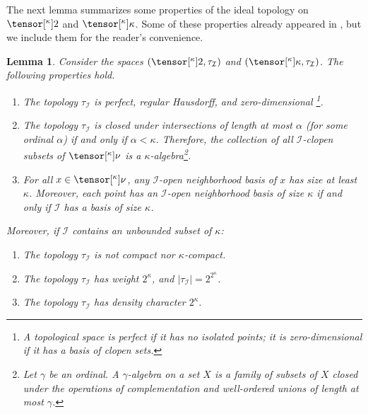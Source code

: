 \documentclass{amsart}
\numberwithin{equation}{section}
\newcommand{\I}{\mathcal{I}}
\newcommand{\pre}[2]{\tensor[^{#1}]{#2}{}}
\newcommand{\1}{\mathbf{I}}
\newcommand{\2}{\mathbf{II}}
\renewcommand{\a}{\alpha}
\newcommand{\g}{\gamma}
\renewcommand{\k}{\kappa}
\newtheorem{lemma}[theorem]{Lemma}
\theoremstyle{definition}
\theoremstyle{remark}
\begin{document}
The next lemma summarizes some properties of the ideal topology on \(\pre{\k}{2}\) and \(\pre{\k}{\k}\). Some of these properties already appeared in \cite{HKSW22}, but we include them for the reader's convenience. 
\begin{lemma}\label{lem:basics}
Consider the spaces \((\pre{\k}{2}, \tau_\I)\) and \((\pre{\k}{\k}, \tau_\I)\). The following properties hold.
\begin{enumerate}[label={\upshape (\arabic*)}, leftmargin=2pc]
    \item\label{T2} The topology \(\tau_\I\) is perfect, regular Hausdorff, and zero-dimensional {}\footnote{A topological space is perfect if it has no isolated points; it is zero-dimensional if it has a basis of clopen sets.}.
    \item\label{add}  The topology \(\tau_\I\) is closed under intersections of length at most \(\a \) (for some ordinal $\a$) if and only if \(\a < \kappa\). Therefore, the collection of all \(\I\)-clopen subsets of \(\pre{\k}{\nu}\) is a \(\k\)-algebra{}\footnote{Let \(\g\) be an ordinal. A \(\g\)-algebra on a set $X$ is a family of subsets of $X$ closed under the operations of complementation and well-ordered unions of length at most \( \g\).}. 
     \item\label{basis} For all \(x  \in \pre{\k}{\nu}\), any \(\I\)-open neighborhood basis of \(x\) has size at least \( \k\). Moreover, each point has an \(\I\)-open neighborhood basis of size \(\k\) if and only if \(\I\) has a basis of size \(\k\).
\end{enumerate}
Moreover, if \(\I\) contains an unbounded subset of \(\k\):
\begin{enumerate}[label={\upshape (\arabic*)}, leftmargin=2pc, resume]
    \item\label{compact} The topology \(\tau_\I\) is not compact nor \(\k\)-compact.
    \item\label{weight} The topology \(\tau_\I\) has weight \(2^\kappa\), and \(|\tau_\I|=2^{2^\k}\).
    \item\label{density} The topology \(\tau_\I\) has density character \(2^\k\).
\end{enumerate}
\end{lemma} 
\end{document}
